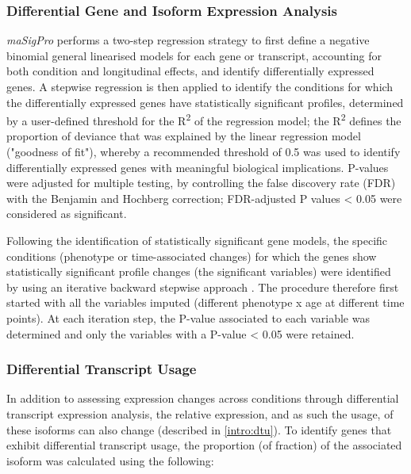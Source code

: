 
\subsubsection{Differential Gene and Isoform Expression Analysis}
\textit{maSigPro} performs a two-step regression strategy to first define a negative binomial general linearised models\cite{Nueda2014} for each gene or transcript, accounting for both condition and longitudinal effects, and identify differentially expressed genes. A stepwise regression is then applied to identify the conditions for which the differentially expressed genes have statistically significant profiles, determined by a user-defined threshold for the R\textsuperscript{2} of the regression model; the R\textsuperscript{2} defines the proportion of deviance that was explained by the linear regression model ("goodness of fit"), whereby a recommended threshold of 0.5 was used to identify differentially expressed genes with meaningful biological implications\cite{Conesa2006}. P-values were adjusted for multiple testing, by controlling the false discovery rate (FDR) with the Benjamin and Hochberg correction; FDR-adjusted P values < 0.05 were considered as significant.

Following the identification of statistically significant gene models, the specific conditions (phenotype or time-associated changes) for which the genes show statistically significant profile changes (the significant variables) were identified by using an iterative backward stepwise approach \cite{Conesa2017}. The procedure therefore first started with all the variables imputed (different phenotype x age at different time points). At each iteration step, the P-value associated to each variable was determined and only the variables with a P-value < 0.05 were retained. 

\subsubsection{Differential Transcript Usage}
\label{ch:diu_method}
In addition to assessing expression changes across conditions through differential transcript expression analysis, the relative expression, and as such the usage, of these isoforms can also change (described in \cref{intro:dtu}). To identify genes that exhibit differential transcript usage, the proportion (of fraction) of the associated isoform was calculated using the following:

